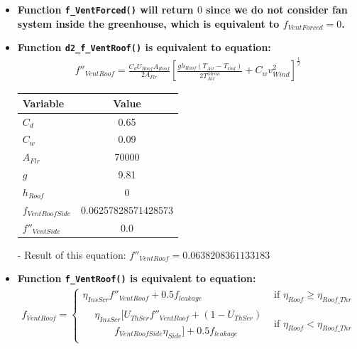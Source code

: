 \documentclass[a4paper]{article}
\numberwithin{equation}{section}
\begin{document}
\begin{itemize}
  \item \textbf{Function \texttt{f\_VentForced()} will return \(0\) since we do not consider fan system inside the greenhouse, which is equivalent to \(f_{VentForced} = 0\).} \label{fVentForced}

  \item \textbf{Function \texttt{d2\_f\_VentRoof()} is equivalent to equation:}
        \begin{align*}
          f''_{VentRoof} = \frac{C_d U_{Roof} A_{Roof}}{2A_{Flr}} {\left[\frac{gh_{Roof}(T_{Air} - T_{Out})}{2T^{Mean}_{Air}} + C_w v^2_{Wind}\right]}^{ \frac{1}{2}}
        \end{align*}

        \begin{table}[H]
          \centering
          \begin{tabular}{@{}lS[table-format=5.17]@{}}
            \toprule
            \textbf{Variable}    & \textbf{Value}      \\
            \midrule
            \(C_d\)              & 0.65                \\
            \(C_w\)              & 0.09                \\
            \(A_{Flr}\)          & 70000               \\
            \(g\)                & 9.81                \\
            \(h_{Roof}\)         & 0                   \\
            \(f_{VentRoofSide}\) & 0.06257828571428573 \\
            \(f''_{VentSide}\)   & 0.0                 \\
            \bottomrule
          \end{tabular}
        \end{table}

  \item[-] Result of this equation: \(f''_{VentRoof} = 0.0638208361133183\)

  \item \textbf{Function \texttt{f\_VentRoof()} is equivalent to equation:}\label{fVentRoof}
        \begin{gather*}
          f_{VentRoof} =
          \begin{cases}
            \eta_{InsScr} f''_{VentRoof} + 0.5f_{leakage} & \text{if~} \eta_{Roof} \geq \eta_{Roof\_Thr} \\
            \begin{split}
              & \eta_{InsScr} [U_{ThScr}f''_{VentRoof} + (1-U_{ThScr}) \\
              & \qquad f_{VentRoofSide} \eta_{Side}] + 0.5 f_{leakage}
            \end{split}                   & \text{if~}  \eta_{Roof} < \eta_{Roof\_Thr}
          \end{cases}
        \end{gather*}


\end{itemize}
\end{document}
